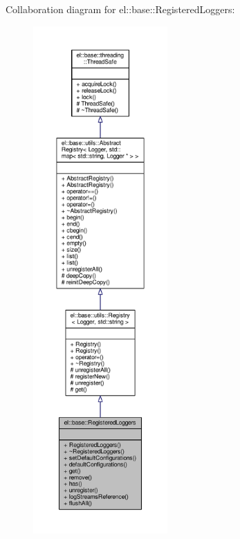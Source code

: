Collaboration diagram for el\+:\+:base\+:\+:Registered\+Loggers\+:
\nopagebreak
\begin{figure}[H]
\begin{center}
\leavevmode
\includegraphics[height=550pt]{df/d6a/classel_1_1base_1_1RegisteredLoggers__coll__graph}
\end{center}
\end{figure}

